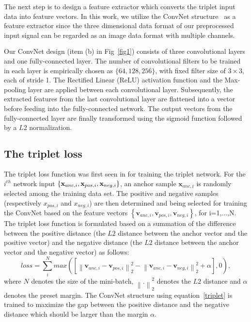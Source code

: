 \documentclass{sig-alternate-05-2015}
\begin{document}
The next step is to design a feature extractor which converts the  triplet input data into feature vectors. In this work, we utilize the ConvNet structure~\cite{lecun1998gradient} as a feature extractor since the three dimensional data format of our preprocessed input signal can be regarded as an image data format with multiple channels. 

Our ConvNet design (item (b) in Fig~\ref{fig1}) consists of three convolutional layers and one fully-connected layer. The number of convolutional filters to be trained in each layer is empirically chosen as $\{64, 128, 256\}$, with fixed filter size of $3\times3$, each of stride 1. The Rectiﬁed Linear (ReLU) activation function and the Max-pooling layer are applied between each convolutional layer. Subsequently, the extracted features from the last convolutional layer are flattened into a vector before feeding into the fully-connected network.
The output vectors from the fully-connected layer are finally transformed using the sigmoid function followed by a $L2$ normalization.

\subsection{The triplet loss}

The triplet loss function was first seen in \cite{hoffer2015deep} for training the triplet network. For the $i^{th}$ network input $\{\mathbf{x}_{anc,i}, \mathbf{x}_{pos,i}, \\ \mathbf{x}_{neg,i}\}$, an anchor sample $\mathbf{x}_{anc,i}$ is randomly selected among the training data set. The positive and negative samples (respectively $x_{pos,i}$ and $x_{neg,i}$) are then determined and being selected for training the ConvNet based on the feature vectors $\left\{\mathbf{v}_{anc,i},\mathbf{v}_{pos,i},\mathbf{v}_{neg,i}\right\}$, for i=1,...,N.
The triplet loss function is formulated based on a summation of the difference between the positive distance (the $L2$ distance between the anchor vector and the positive vector) and the negative distance (the $L2$ distance between the anchor vector and the negative vector) as follows:
\begin{equation}
    loss = \sum_i^N max\left({ \left[ {\left\| {{\mathbf{v}_{anc,i}} - {\mathbf{v}_{pos,i}}} \right\|_2^2} - {\left\| {{\mathbf{v}_{anc,i}} - {\mathbf{v}_{neg,i}}} \right\|_2^2}  + \alpha \right]},0 \right),\label{triplet}
\end{equation}
where $N$ denotes the size of the mini-batch, ${\left\| . \right\|_2^2}$ denotes the $L2$ distance and $\alpha$ denotes the preset margin.
The ConvNet structure using equation~\eqref{triplet} is trained to maximize the gap between the positive distance and the negative distance which should be larger than the margin $\alpha$.
\end{document}

